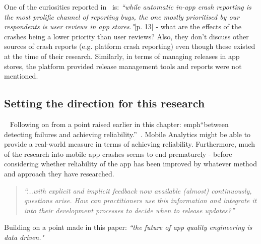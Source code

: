 One of the curiosities reported in~\textcite{alsubaihin2019app_store_effects_on_software_engineering} is: \emph{``while automatic in-app crash reporting is the most prolific channel of reporting bugs, the one mostly prioritised by our respondents is user reviews in app stores."}[p. 13] - what are the effects of the crashes being a lower priority than user reviews? Also, they don't discuss other sources of crash reports (e.g. platform crash reporting) even though these existed at the time of their research.
%
Similarly, in terms of managing releases in app stores, the platform provided release management tools and reports were not mentioned. 

\subsection{Setting the direction for this research}~\label{rw-setting-the-direction-for-this-research-topic}
Following on from a point raised earlier in this chapter: emph{``between detecting failures and achieving reliability.''}~. Mobile Analytics might be able to provide a real-world measure in terms of achieving reliability. Furthermore, much of the research into mobile app crashes seems to end prematurely - before considering whether reliability of the app has been improved by whatever method and approach they have researched.

\begin{quote}
    \emph{``...with explicit and implicit feedback now available (almost) continuously, questions arise. How can practitioners use this information and integrate it into their development processes to decide when to release updates?''}\cite[pp. 48-49]{maalej2016_towards_data_driven_requirements_engineering}    
\end{quote}

Building on a point made in this paper: \emph{``the future of app quality engineering is data driven."}~\cite[p. 24]{nagappan2016_future_trends_in_sw_eng_for_mobile_apps} %



